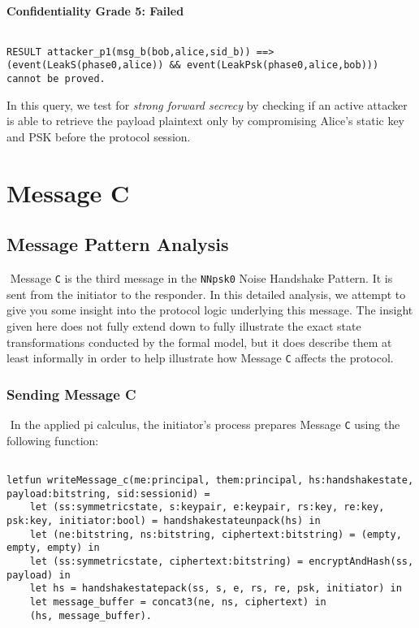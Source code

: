 \paragraph{Confidentiality Grade 5: Failed}$ $
\begin{lstlisting}
RESULT attacker_p1(msg_b(bob,alice,sid_b)) ==> (event(LeakS(phase0,alice)) && event(LeakPsk(phase0,alice,bob))) cannot be proved.
\end{lstlisting}

In this query, we test for \emph{strong forward secrecy} by checking if an active attacker is able to retrieve the payload plaintext only by compromising Alice's static key and PSK before the protocol session.


\section{ Message C}

\subsection{Message Pattern Analysis}$ $
Message \texttt{C} is the third message in the \texttt{NNpsk0} Noise Handshake Pattern. It is sent from the initiator to the responder. In this detailed analysis, we attempt to give you some insight into the protocol logic underlying this message. The insight given here does not fully extend down to fully illustrate the exact state transformations conducted by the formal model, but it does describe them at least informally in order to help illustrate how Message \texttt{C} affects the protocol.


\subsubsection{Sending Message C}$ $
In the applied pi calculus, the initiator's process prepares Message \texttt{C} using the following function:


\begin{lstlisting}

letfun writeMessage_c(me:principal, them:principal, hs:handshakestate, payload:bitstring, sid:sessionid) =
	let (ss:symmetricstate, s:keypair, e:keypair, rs:key, re:key, psk:key, initiator:bool) = handshakestateunpack(hs) in
	let (ne:bitstring, ns:bitstring, ciphertext:bitstring) = (empty, empty, empty) in
	let (ss:symmetricstate, ciphertext:bitstring) = encryptAndHash(ss, payload) in
	let hs = handshakestatepack(ss, s, e, rs, re, psk, initiator) in
	let message_buffer = concat3(ne, ns, ciphertext) in
	(hs, message_buffer).

\end{lstlisting}

